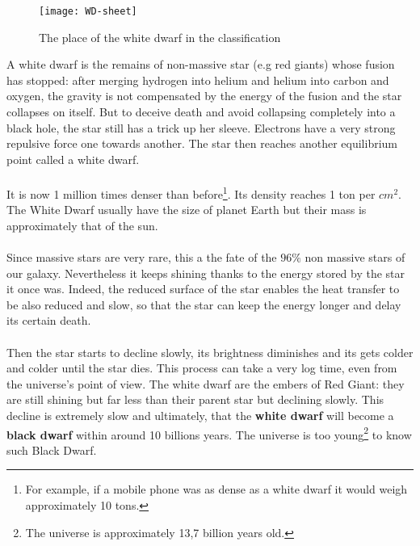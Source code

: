 \documentclass[a4paper, 11pt]{article} %
\begin{document}
\begin{figure}[h]
\centering
\texttt{[image: WD-sheet]}
\caption{The place of the white dwarf in the classification }
\end{figure}

\label{whiteDwarf}
A white dwarf is the remains of non-massive star (e.g red giants) whose fusion has stopped: after merging hydrogen into helium and helium into carbon and oxygen, the gravity is not compensated by the energy of the fusion and the star collapses on itself. But to deceive death and avoid collapsing completely into a black hole, the star still has a trick up her sleeve. Electrons have a very strong repulsive force one towards another. The star then reaches another equilibrium point called a white dwarf.


\paragraph*{}
 It is now 1 million times denser than before\footnote{For example, if a mobile phone was as dense as a white dwarf it would weigh approximately 10 tons.}. Its density reaches 1 ton per $cm^2$. The White Dwarf usually have the size of planet Earth but their mass is approximately that of the sun.

\paragraph*{}

Since massive stars are very rare, this a the fate of the $96\%$ non massive stars of our galaxy. 
Nevertheless it keeps shining thanks to the energy stored by the star it once was. Indeed, the reduced surface of the star enables the heat transfer to be also reduced and slow, so that the star can keep the energy longer and delay its certain death.
\paragraph*{}

Then the star starts to decline slowly, its brightness diminishes and its gets colder and colder until the star dies. This process can take a very log time, even from the universe's point of view. 
The white dwarf are the embers of Red Giant: they are still shining but far less than their parent star but declining slowly.
This decline is extremely slow and ultimately, that the \textbf{white dwarf} will become a \textbf{black dwarf} within around 10 billions years. The universe is too young\footnote{The universe is approximately 13,7 billion years old.} to know such Black Dwarf. 
\end{document}
